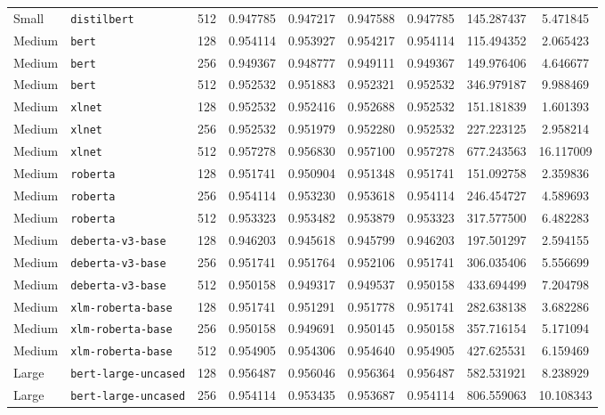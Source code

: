 \documentclass[11pt]{article}
\begin{document}
\begin{landscape}
\begin{longtable}{llccccccc}
Small & \texttt{distilbert} & 512 & 0.947785 & 0.947217 & 0.947588 & 0.947785 & 145.287437 & 5.471845 \\
Medium & \texttt{bert} & 128 & 0.954114 & 0.953927 & 0.954217 & 0.954114 & 115.494352 & 2.065423 \\
Medium & \texttt{bert} & 256 & 0.949367 & 0.948777 & 0.949111 & 0.949367 & 149.976406 & 4.646677 \\
Medium & \texttt{bert} & 512 & 0.952532 & 0.951883 & 0.952321 & 0.952532 & 346.979187 & 9.988469 \\
Medium & \texttt{xlnet} & 128 & 0.952532 & 0.952416 & 0.952688 & 0.952532 & 151.181839 & 1.601393 \\
Medium & \texttt{xlnet} & 256 & 0.952532 & 0.951979 & 0.952280 & 0.952532 & 227.223125 & 2.958214 \\
Medium & \texttt{xlnet} & 512 & 0.957278 & 0.956830 & 0.957100 & 0.957278 & 677.243563 & 16.117009 \\
Medium & \texttt{roberta} & 128 & 0.951741 & 0.950904 & 0.951348 & 0.951741 & 151.092758 & 2.359836 \\
Medium & \texttt{roberta} & 256 & 0.954114 & 0.953230 & 0.953618 & 0.954114 & 246.454727 & 4.589693 \\
Medium & \texttt{roberta} & 512 & 0.953323 & 0.953482 & 0.953879 & 0.953323 & 317.577500 & 6.482283 \\
Medium & \texttt{deberta-v3-base} & 128 & 0.946203 & 0.945618 & 0.945799 & 0.946203 & 197.501297 & 2.594155 \\
Medium & \texttt{deberta-v3-base} & 256 & 0.951741 & 0.951764 & 0.952106 & 0.951741 & 306.035406 & 5.556699 \\
Medium & \texttt{deberta-v3-base} & 512 & 0.950158 & 0.949317 & 0.949537 & 0.950158 & 433.694499 & 7.204798 \\
Medium & \texttt{xlm-roberta-base} & 128 & 0.951741 & 0.951291 & 0.951778 & 0.951741 & 282.638138 & 3.682286 \\
Medium & \texttt{xlm-roberta-base} & 256 & 0.950158 & 0.949691 & 0.950145 & 0.950158 & 357.716154 & 5.171094 \\
Medium & \texttt{xlm-roberta-base} & 512 & 0.954905 & 0.954306 & 0.954640 & 0.954905 & 427.625531 & 6.159469 \\
Large & \texttt{bert-large-uncased} & 128 & 0.956487 & 0.956046 & 0.956364 & 0.956487 & 582.531921 & 8.238929 \\
Large & \texttt{bert-large-uncased} & 256 & 0.954114 & 0.953435 & 0.953687 & 0.954114 & 806.559063 & 10.108343 \\

\end{longtable}
\end{landscape}
\end{document}
